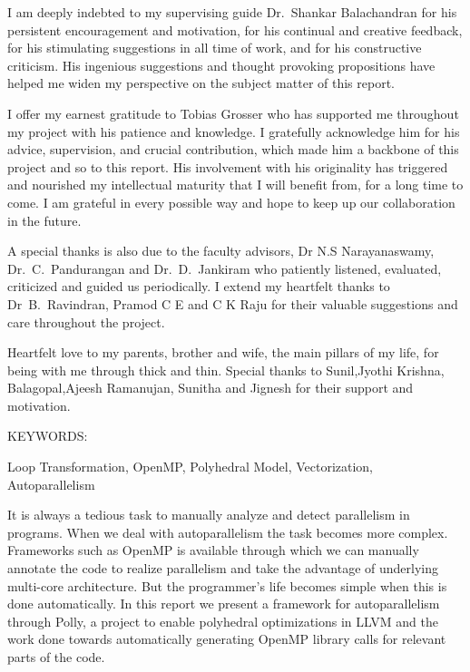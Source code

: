 \documentclass[MTech]{iitmdiss}
\begin{document}
I am deeply indebted to my supervising guide Dr.~Shankar Balachandran
for his persistent encouragement and motivation, for his continual and
creative feedback, for his stimulating suggestions in all time of work,
and for his constructive criticism. His ingenious suggestions and thought
provoking propositions have helped me widen my perspective on the subject
matter of this report.
 
I offer my earnest gratitude to Tobias Grosser who has supported me throughout
my project with his patience and knowledge. I gratefully acknowledge him for his advice,
supervision, and crucial contribution, which made him a backbone of this project
and so to this report. His involvement with his originality has triggered and
nourished my intellectual maturity that I will benefit from, for a long time to come. 
I am grateful in every possible way and hope to keep up our collaboration in the future.

A special thanks is also due to the faculty advisors, Dr N.S Narayanaswamy, Dr.~C.~Pandurangan
and Dr.~D.~Jankiram who patiently listened, evaluated, criticized and guided us periodically.
I extend my heartfelt thanks to Dr~B.~Ravindran, Pramod C E and C K Raju for
their valuable suggestions and care throughout the project.

Heartfelt love to my parents, brother and wife, the main pillars of my life, for being with me through thick and thin.
Special thanks to Sunil,Jyothi Krishna, Balagopal,Ajeesh Ramanujan, Sunitha and Jignesh for their support and motivation.


\abstract

\noindent KEYWORDS: \hspace*{0.5em} \parbox[t]{4.4in}{Loop Transformation,
OpenMP, Polyhedral Model, Vectorization, Autoparallelism}

\vspace*{24pt}

It is always a tedious task to manually analyze and detect parallelism in programs. When
we deal with autoparallelism the task becomes more complex. Frameworks such as OpenMP
is available through which we can manually annotate the code to realize parallelism and take the
advantage of underlying multi-core architecture. But the programmer's life becomes simple
when this is done automatically. In this report we present a framework for autoparallelism through Polly,
a project to enable polyhedral optimizations in LLVM and the work done
towards automatically generating OpenMP library calls for relevant parts of the code.
\end{document}

